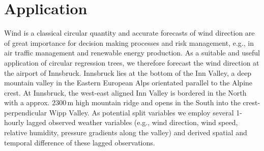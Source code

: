 \documentclass[twoside]{report}
\begin{document}



\section{Application}


Wind is a classical circular quantity and accurate forecasts of wind direction
are of great importance for decision making processes and risk management,
e.g., in air traffic management and renewable energy production. As a suitable
and useful application of circular regression trees, we therefore forecast the
wind direction at the airport of Innsbruck. Innsbruck lies at the bottom of the
Inn Valley, a deep mountain valley in the Eastern European Alps orientated
parallel to the Alpine crest. At Innsbruck, the west-east aligned Inn Valley is
bordered in the North with a approx. 2300\,m high mountain ridge and opens in
the South into the crest-perpendicular Wipp Valley. As potential split
variables we employ several 1-hourly lagged observed weather variables (e.g.,
wind direction, wind speed, relative humidity, pressure gradients along the
valley) and derived spatial and temporal difference of these lagged
observations. 
\end{document}
